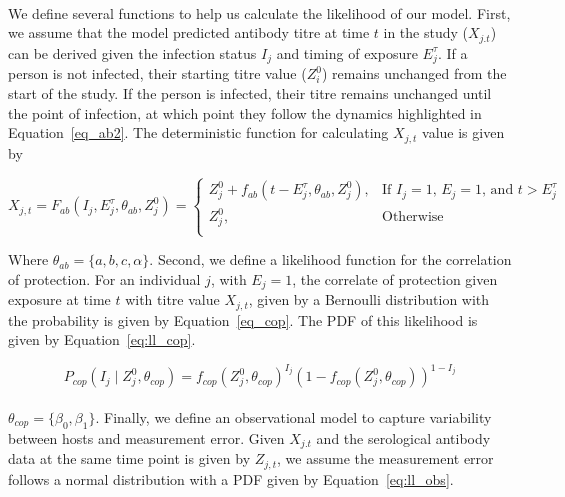 \documentclass{article}
\begin{document}
\paragraph{}We define several functions to help us calculate the likelihood of our model. First, we assume that the model predicted antibody titre at time $t$ in the study ($X_{j.t}$) can be derived given the infection status $I_j$ and timing of exposure $E_j^\tau$. If a person is not infected, their starting titre value ($Z^0_i$) remains unchanged from the start of the study. If the person is infected, their titre remains unchanged until the point of infection, at which point they follow the dynamics highlighted in Equation~\ref{eq_ab2}. The deterministic function for calculating $X_{j,t}$ value is given by

\begin{equation}
\label{eq:ll_abkin}
X_{j,t}  = F_{ab}( I_j,  E_j^\tau, \theta_{ab}, Z^0_j) = 
	\begin{cases}
	Z^0_j + f_{ab}(t - E_j^\tau, \theta_{ab}, Z^0_j),  & \text{If $I_j = 1$, $E_j = 1$, and $t > E_j^\tau$} \\
	Z^0_j, & \text{Otherwise} \\ 
	\end{cases}
\end{equation}

Where $\theta_{ab} = \{a, b, c, \alpha\}$. Second, we define a likelihood function for the correlation of protection. For an individual $j$, with $E_j = 1$, the correlate of protection given exposure at time $t$ with titre value $X_{j, t}$, given by a Bernoulli distribution with the probability is given by Equation~\ref{eq_cop}. The PDF of this likelihood is given by Equation~\ref{eq:ll_cop}.

\begin{equation}
\label{eq:ll_cop}
P_{cop}(I_j \mid Z_{j}^0, \theta_{cop} ) =  f_{cop}(Z_{j}^0,  \theta_{cop})^{I_j}(1- f_{cop}(Z_{j}^0,  \theta_{cop} ))^{1-I_j}
\end{equation}

\paragraph{}$\theta_{cop} = \{\beta_0, \beta_1\}$. Finally, we define an observational model to capture variability between hosts and measurement error. Given $X_{j.t}$ and the serological antibody data at the same time point is given by $Z_{j, t}$, we assume the measurement error follows a normal distribution with a PDF given by Equation~\ref{eq:ll_obs}.
\end{document}

